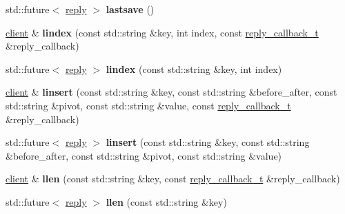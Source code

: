 \begin{DoxyCompactItemize}
\item 
\mbox{\label{classcpp__redis_1_1client_a6b550a4ecf6eb33abffd664c3124b4f9}} 
std\+::future$<$ \hyperlink{classcpp__redis_1_1reply}{reply} $>$ {\bfseries lastsave} ()
\item 
\mbox{\label{classcpp__redis_1_1client_afa409d5b28466837137dfb12c3554070}} 
\hyperlink{classcpp__redis_1_1client}{client} \& {\bfseries lindex} (const std\+::string \&key, int index, const \hyperlink{classcpp__redis_1_1client_a061a1140d36d2eaeda82b09a0bb3f9f2}{reply\+\_\+callback\+\_\+t} \&reply\+\_\+callback)
\item 
\mbox{\label{classcpp__redis_1_1client_a58458ef30b1fb49584395b6f8584b931}} 
std\+::future$<$ \hyperlink{classcpp__redis_1_1reply}{reply} $>$ {\bfseries lindex} (const std\+::string \&key, int index)
\item 
\mbox{\label{classcpp__redis_1_1client_a80799f12e6aafe07872b2bbea453db53}} 
\hyperlink{classcpp__redis_1_1client}{client} \& {\bfseries linsert} (const std\+::string \&key, const std\+::string \&before\+\_\+after, const std\+::string \&pivot, const std\+::string \&value, const \hyperlink{classcpp__redis_1_1client_a061a1140d36d2eaeda82b09a0bb3f9f2}{reply\+\_\+callback\+\_\+t} \&reply\+\_\+callback)
\item 
\mbox{\label{classcpp__redis_1_1client_ab8d167d78e3c956fd1ade0e2f992f46a}} 
std\+::future$<$ \hyperlink{classcpp__redis_1_1reply}{reply} $>$ {\bfseries linsert} (const std\+::string \&key, const std\+::string \&before\+\_\+after, const std\+::string \&pivot, const std\+::string \&value)
\item 
\mbox{\label{classcpp__redis_1_1client_a2e0a911a6bb87224896b7c33da7ac058}} 
\hyperlink{classcpp__redis_1_1client}{client} \& {\bfseries llen} (const std\+::string \&key, const \hyperlink{classcpp__redis_1_1client_a061a1140d36d2eaeda82b09a0bb3f9f2}{reply\+\_\+callback\+\_\+t} \&reply\+\_\+callback)
\item 
\mbox{\label{classcpp__redis_1_1client_a2890fccb9efd08b38195c8fb5fd1651e}} 
std\+::future$<$ \hyperlink{classcpp__redis_1_1reply}{reply} $>$ {\bfseries llen} (const std\+::string \&key)

\end{DoxyCompactItemize}
